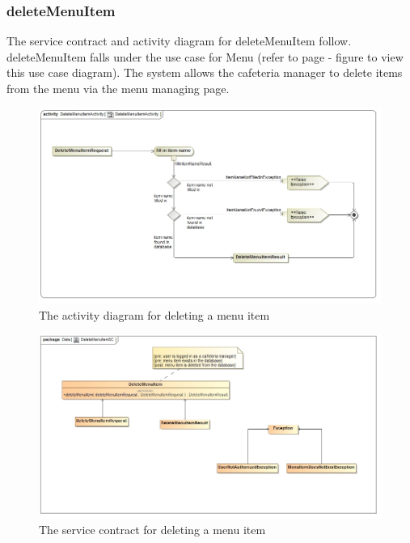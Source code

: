 \documentclass[a4paper,12pt]{report}
\begin{document}
 \subsubsection{deleteMenuItem}
The service contract and activity diagram for deleteMenuItem follow. deleteMenuItem falls under the use case for Menu (refer to page   - figure   to view this use case diagram). The system allows the cafeteria manager to delete items from the menu via the menu managing page.
\begin{figure}[H]
  \centering
    \includegraphics[width=1.0\textwidth]{../images/DeleteMenuItemActivity.jpg}
    \caption{The activity diagram for deleting a menu item } 
\end{figure}
\begin{figure}[H]
	\centering
	\includegraphics[width=1.0\textwidth]{../images/DeleteMenuItemSC.jpg}
	\caption{The service contract for deleting a menu item}
\end{figure}
\end{document}
